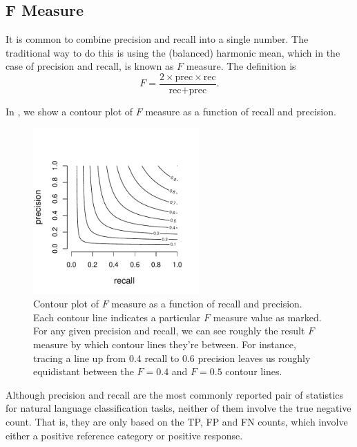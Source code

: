 \subsection{F Measure}

It is common to combine precision and recall into a single number.  
The traditional way to do this is using the (balanced) harmonic mean,
which in the case of precision and recall, is known as $F$ measure.
The definition is
%
\begin{equation}
F = \frac{2 \times \mbox{prec} \times \mbox{rec}}
         {\mbox{rec} + \mbox{prec}}.
\end{equation}
%

In , we show a contour plot of $F$ measure
as a function of recall and precision.
%
\begin{figure}
\begin{center}
\includegraphics[height=2.5in]{pdfs/f-measure-contour.pdf}
\end{center}
\vspace*{-24pt}
\caption{Contour plot of $F$ measure as a function of recall and
  precision.  Each contour line indicates a particular $F$ measure
  value as marked.  For any given precision and recall, we can see
  roughly the result $F$ measure by which contour lines they're
  between.  For instance, tracing a line up from 0.4 recall to 0.6
  precision leaves us roughly equidistant between the $F=0.4$ and
  $F=0.5$ contour lines.}\label{fig:f-measure-contour}
\end{figure}


Although precision and recall are the most commonly reported pair of
statistics for natural language classification tasks, neither of them
involve the true negative count.  That is, they are only based on the
TP, FP and FN counts, which involve either a positive reference
category or positive response.



